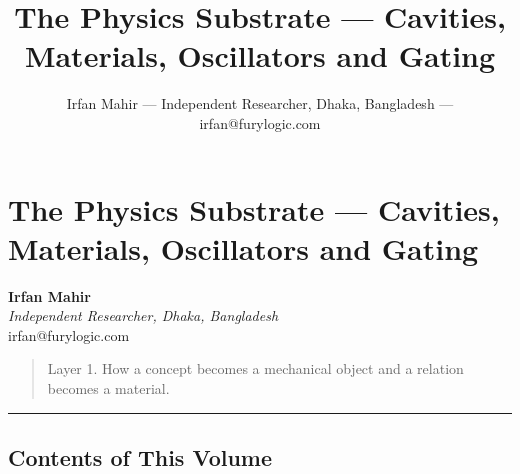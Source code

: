 \documentclass[
  11pt,
  a4paper,
]{article}
\title{The Physics Substrate --- Cavities, Materials, Oscillators and
Gating}
\author{Irfan Mahir --- Independent Researcher, Dhaka, Bangladesh ---
irfan@furylogic.com}
\date{}
\begin{document}
\maketitle

{
\hypersetup{linkcolor=}
\setcounter{tocdepth}{2}
\tableofcontents
}
\section{The Physics Substrate --- Cavities, Materials, Oscillators and
Gating}\label{the-physics-substrate-cavities-materials-oscillators-and-gating}

\textbf{Irfan Mahir}\\
\emph{Independent Researcher, Dhaka, Bangladesh}\\
irfan@furylogic.com

\begin{quote}
Layer 1. How a concept becomes a mechanical object and a relation
becomes a material.
\end{quote}

\begin{center}\rule{0.5\linewidth}{0.5pt}\end{center}

\subsection{Contents of This Volume}\label{contents-of-this-volume}
\end{document}
